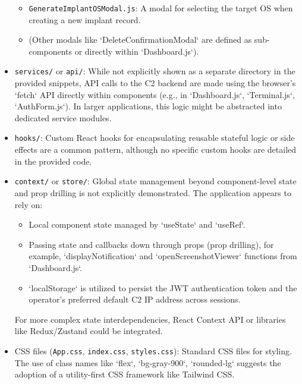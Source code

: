 \begin{itemize}
\begin{itemize}
            \item \texttt{GenerateImplantOSModal.js}: A modal for selecting the target OS when creating a new implant record.
            \item (Other modals like `DeleteConfirmationModal` are defined as sub-components or directly within `Dashboard.js`).
        \end{itemize}
    \item \texttt{services/} or \texttt{api/}: While not explicitly shown as a separate directory in the provided snippets, API calls to the C2 backend are made using the browser's `fetch` API directly within components (e.g., in `Dashboard.js`, `Terminal.js`, `AuthForm.js`). In larger applications, this logic might be abstracted into dedicated service modules.
    \item \texttt{hooks/}: Custom React hooks for encapsulating reusable stateful logic or side effects are a common pattern, although no specific custom hooks are detailed in the provided code.
    \item \texttt{context/} or \texttt{store/}: Global state management beyond component-level state and prop drilling is not explicitly demonstrated. The application appears to rely on:
        \begin{itemize}
            \item Local component state managed by `useState` and `useRef`.
            \item Passing state and callbacks down through props (prop drilling), for example, `displayNotification` and `openScreenshotViewer` functions from `Dashboard.js`.
            \item `localStorage` is utilized to persist the JWT authentication token and the operator's preferred default C2 IP address across sessions.
        \end{itemize}
        For more complex state interdependencies, React Context API or libraries like Redux/Zustand could be integrated.
    \item CSS files (\texttt{App.css}, \texttt{index.css}, \texttt{styles.css}): Standard CSS files for styling. The use of class names like `flex`, `bg-gray-900`, `rounded-lg` suggests the adoption of a utility-first CSS framework like Tailwind CSS.
\end{itemize}

